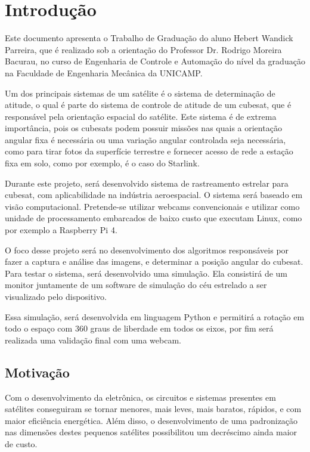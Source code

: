 
\chapter{Introdução}
\label{cap:Introducao_init}

Este documento apresenta o Trabalho de Graduação do aluno Hebert Wandick Parreira, que é realizado sob a orientação do Professor Dr. Rodrigo Moreira Bacurau, no curso de Engenharia de Controle e Automação do nível da graduação na Faculdade de Engenharia Mecânica da UNICAMP.

Um dos principais sistemas de um satélite é o sistema de determinação de atitude, o qual é parte do sistema de controle de atitude de um cubesat, que é responsável pela orientação espacial do satélite. Este sistema é de extrema importância, pois os cubesats podem possuir missões nas quais a orientação angular fixa é necessária ou uma variação angular controlada seja necessária, como para tirar fotos da superfície terrestre e fornecer acesso de rede a estação fixa em solo, como por exemplo, é o caso do Starlink.

Durante este projeto, será desenvolvido sistema de rastreamento estrelar para cubesat, com aplicabilidade  na indústria aeroespacial. O sistema será baseado em visão computacional. Pretende-se utilizar webcams convencionais e utilizar como unidade de processamento embarcados de baixo custo que executam Linux, como por exemplo a Raspberry Pi 4.

O foco desse projeto será no desenvolvimento dos algoritmos responsáveis por fazer a captura e análise das imagens, e determinar a posição  angular do cubesat. Para testar o sistema, será desenvolvido uma simulação. Ela consistirá de um monitor juntamente de um software  de simulação do céu estrelado a ser visualizado pelo dispositivo. 

Essa simulação, será desenvolvida em linguagem Python e permitirá a rotação em todo o espaço com 360 graus de liberdade em todos os eixos, por fim será realizada uma validação final com uma webcam.

\section{Motivação}
\label{sec:Introducao_motivacao}
Com o desenvolvimento da eletrônica, os circuitos e sistemas presentes em satélites conseguiram se tornar menores, mais leves, mais baratos, rápidos, e com maior eficiência  energética. Além disso, o desenvolvimento de uma padronização nas dimensões destes pequenos satélites possibilitou um decréscimo ainda maior de custo.

